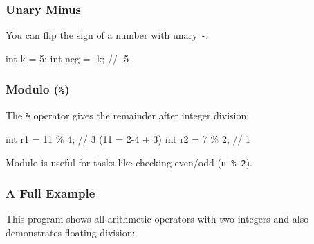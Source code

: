 \documentclass[
  letterpaper,
  DIV=11,
  numbers=noendperiod]{scrreprt}
\newenvironment{Shaded}{\begin{snugshade}}{\end{snugshade}}
\newcommand{\CommentTok}[1]{\textcolor[rgb]{0.37,0.37,0.37}{#1}}
\newcommand{\DataTypeTok}[1]{\textcolor[rgb]{0.68,0.00,0.00}{#1}}
\newcommand{\DecValTok}[1]{\textcolor[rgb]{0.68,0.00,0.00}{#1}}
\newcommand{\NormalTok}[1]{\textcolor[rgb]{0.00,0.23,0.31}{#1}}
\newcommand{\OperatorTok}[1]{\textcolor[rgb]{0.37,0.37,0.37}{#1}}
\begin{document}
\subsubsection{Unary Minus}\label{unary-minus}

You can flip the sign of a number with unary \texttt{-}:

\begin{Shaded}
\begin{Highlighting}[]
\DataTypeTok{int}\NormalTok{ k }\OperatorTok{=} \DecValTok{5}\OperatorTok{;}
\DataTypeTok{int}\NormalTok{ neg }\OperatorTok{=} \OperatorTok{{-}}\NormalTok{k}\OperatorTok{;}   \CommentTok{// {-}5}
\end{Highlighting}
\end{Shaded}

\subsubsection{\texorpdfstring{Modulo
(\texttt{\%})}{Modulo (\%)}}\label{modulo}

The \texttt{\%} operator gives the remainder after integer division:

\begin{Shaded}
\begin{Highlighting}[]
\DataTypeTok{int}\NormalTok{ r1 }\OperatorTok{=} \DecValTok{11} \OperatorTok{\%} \DecValTok{4}\OperatorTok{;}   \CommentTok{// 3  (11 = 2{-}4 + 3)}
\DataTypeTok{int}\NormalTok{ r2 }\OperatorTok{=} \DecValTok{7} \OperatorTok{\%} \DecValTok{2}\OperatorTok{;}    \CommentTok{// 1}
\end{Highlighting}
\end{Shaded}

Modulo is useful for tasks like checking even/odd (\texttt{n\ \%\ 2}).

\subsubsection{A Full Example}\label{a-full-example-4}

This program shows all arithmetic operators with two integers and also
demonstrates floating division:
\end{document}
